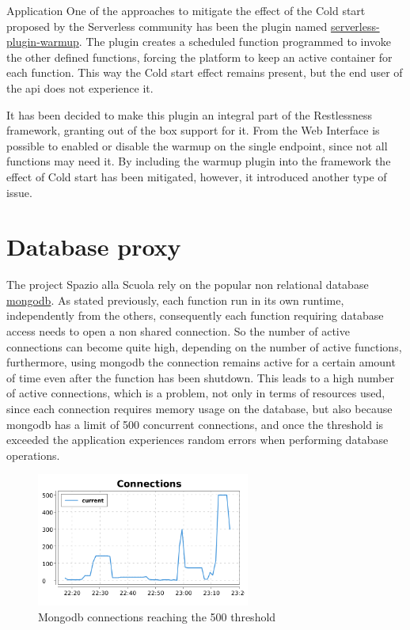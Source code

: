 \begin{chapter}{Application}
    One of the approaches to mitigate the effect of the Cold start proposed by the
    Serverless community has been the plugin named
    \href{https://www.npmjs.com/package/serverless-plugin-warmup}{serverless-plugin-warmup}.
    The plugin creates a scheduled function programmed to invoke the other defined functions,
    forcing the platform to keep an active container for each function.
    This way the Cold start effect remains present, but the end user of the api does
    not experience it.

    It has been decided to make this plugin an integral part of the Restlessness framework,
    granting out of the box support for it. From the Web Interface is possible to
    enabled or disable the warmup on the single endpoint, since not all functions may
    need it.
    By including the warmup plugin into the framework the effect of Cold start has
    been mitigated, however, it introduced another type of issue.

    \section{Database proxy}
    The project Spazio alla Scuola rely on the popular non relational database
    \href{https://www.mongodb.com}{mongodb}. As stated previously, each function
    run in its own runtime, independently from the others, consequently each function
    requiring database access needs to open a non shared connection.
    So the number of active connections can become quite high, depending on the number
    of active functions, furthermore, using mongodb the connection remains active for
    a certain amount of time even after the function has been shutdown.
    This leads to a high number of active connections, which is a problem, not only
    in terms of resources used, since each connection requires memory usage on the
    database, but also because mongodb has a limit of 500 concurrent connections,
    and once the threshold is exceeded the application experiences random errors when
    performing database operations.
    \begin{figure}
        \centering
        \includegraphics[width=7cm]{source/images/mongo-connections.png}
        \caption{Mongodb connections reaching the 500 threshold}
    \end{figure}


\end{chapter}
